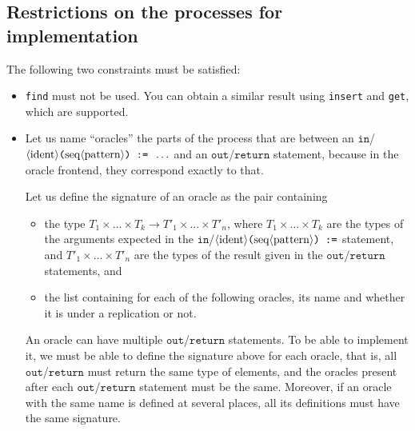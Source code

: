 \subsection{Restrictions on the processes for implementation}

The following two constraints must be satisfied:
\begin{itemize}

\item \texttt{find} must not be used. You can obtain a similar
result using \texttt{insert} and \texttt{get}, which are supported.

\item 
Let us name ``oracles'' the parts of the process that are between an
$\texttt{in}$/$\langle\textrm{ident}\rangle\texttt{(}\textrm{seq}\langle\textrm{pattern}\rangle\texttt{) :=
}\ldots$ and an $\texttt{out}$/$\texttt{return}$ statement,
because in the oracle frontend, they correspond exactly to that.

Let us define the signature of an oracle as the pair containing
\begin{itemize}
\item the type
  $T_1\times\ldots\times T_k \rightarrow T'_1\times\ldots\times T'_n$, 
where $T_1\times\ldots\times T_k$ are the types of the
  arguments expected in the
  $\texttt{in}$/$\langle\textrm{ident}\rangle\texttt{(}\textrm{seq}\langle\textrm{pattern}\rangle\texttt{) :=}$
  statement, and $T'_1\times\ldots\times T'_n$ are the types of the result
  given in the $\texttt{out}$/$\texttt{return}$ statements, and

\item the list containing for each of the following oracles,
its name and whether it is under a replication or not.

\end{itemize}
  An oracle can have multiple $\texttt{out}$/$\texttt{return}$
  statements.  To be able to implement it, we must be able to define
  the signature above for each oracle, that is, all
  $\texttt{out}$/$\texttt{return}$ must return the same type of
  elements, and the oracles present after each
  $\texttt{out}$/$\texttt{return}$ statement must be the same.
  Moreover, if an oracle with the same name is defined at several
  places, all its definitions must have the same signature.
\end{itemize}

